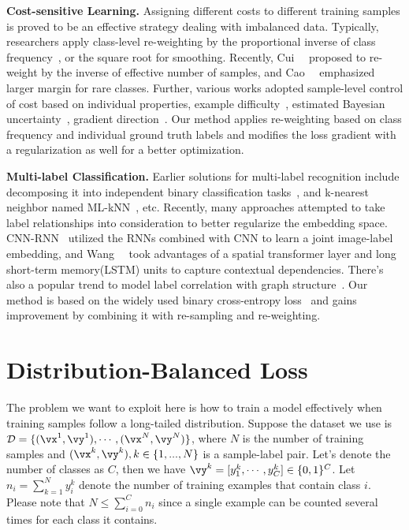 \documentclass[runningheads]{llncs}
\begin{document}
\noindent\textbf{Cost-sensitive Learning.}
Assigning different costs to different training samples is proved to be an effective strategy dealing with imbalanced data.
Typically, researchers apply class-level re-weighting by the proportional inverse of class frequency~\cite{huang2016learning,wang2017learning}, or the square root for smoothing. Recently, Cui~\etal~\cite{cui2019cb} proposed to re-weight by the inverse of effective number of samples, and Cao~\etal~\cite{cao2019ldam} emphasized larger margin for rare classes.
Further, various works adopted sample-level control of cost based on individual properties, \eg example difficulty~\cite{lin2017focal}, estimated Bayesian uncertainty~\cite{khan2019striking}, gradient direction~\cite{ren2018learning}.
Our method applies re-weighting based on class frequency and individual ground truth labels and modifies the loss gradient with a regularization as well for a better optimization.

\noindent\textbf{Multi-label Classification.}
Earlier solutions for multi-label recognition include decomposing it into independent binary classification tasks~\cite{tsoumakas2007overview}, and k-nearest neighbor named ML-kNN~\cite{zhang2007mlknn}, etc.
Recently, many approaches attempted to take label relationships into consideration to better regularize the embedding space. 
CNN-RNN~\cite{wang2016cnnrnn} utilized the RNNs combined with CNN to learn a joint image-label embedding, and Wang~\etal~\cite{wang2017recurrently} took advantages of a spatial transformer layer and long short-term memory(LSTM) units to capture contextual dependencies. There's also a popular trend to model label correlation with graph structure~\cite{lee2018multizero,chen2019mlgcn}.
Our method is based on the widely used binary cross-entropy loss~\cite{dur2019partial} and gains improvement by combining it with re-sampling and re-weighting.
 \section{Distribution-Balanced Loss} 
The problem we want to exploit here is how to train a model effectively when training samples follow a long-tailed distribution.
Suppose the dataset we use is $\mathcal{D}= \{(\vx^1, \vy^1), \cdots, (\vx^N, \vy^N)\}$,
where $N$ is the number of training samples and $( \vx^k, \vy^k ),k \in \{1, ... , N\}$ is a sample-label pair.
Let's denote the number of classes as $C$, then we have $\vy^k = [y^k_1, \cdots, y^k_C] \in \{0,1\}^C$.
Let $n_i = \sum_{k=1}^{N} y_i^k$ denote the number of training examples that contain class $i$.
Please note that $N \leq \sum_{i=0}^C n_i$ since a single example can be counted several times for each class it contains.
\end{document}
